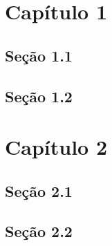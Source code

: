 \documentclass{memoir}
\begin{document}
\chapter{Capítulo 1}

\section{Seção 1.1}
\section{Seção 1.2}

\chapter{Capítulo 2}

\section{Seção 2.1}
\section{Seção 2.2}
\end{document}
